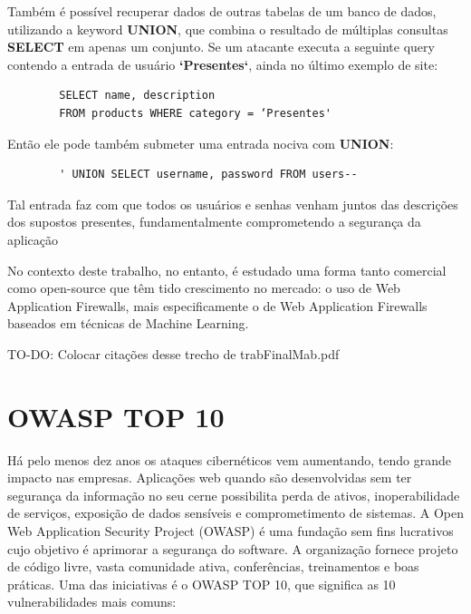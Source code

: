 \begin{alineas}
    \item
    Também é possível recuperar dados de outras tabelas de um banco de dados, utilizando a keyword \textbf{UNION}, que combina o resultado de múltiplas consultas \textbf{SELECT} em apenas um conjunto. Se um atacante executa a seguinte query contendo a entrada de usuário \textbf{`Presentes`}, ainda no último exemplo de site:
    
    \begin{verbatim}
        SELECT name, description
        FROM products WHERE category = ‘Presentes'
    \end{verbatim}
    
    Então ele pode também submeter uma entrada nociva com \textbf{UNION}:
    
    \begin{verbatim}
        ' UNION SELECT username, password FROM users--
    \end{verbatim}
        
    Tal entrada faz com que todos os usuários e senhas venham juntos das descrições dos supostos presentes, fundamentalmente comprometendo a segurança da aplicação

\end{alineas}


No contexto deste trabalho, no entanto, é estudado uma forma tanto comercial como open-source que têm tido crescimento no mercado: o uso de Web Application Firewalls, mais especificamente o de Web Application Firewalls baseados em técnicas de Machine Learning.

TO-DO: Colocar citações desse trecho de trabFinalMab.pdf 

\section{OWASP TOP 10}

Há pelo menos dez anos os ataques cibernéticos vem aumentando, tendo grande impacto nas empresas.
Aplicações web quando são desenvolvidas sem ter segurança da informação no seu cerne possibilita perda de ativos, inoperabilidade de serviços, exposição de dados sensíveis e comprometimento de sistemas. 
A Open Web Application Security Project (OWASP) é uma fundação sem fins lucrativos cujo objetivo é aprimorar a segurança do software. A organização fornece projeto de código livre, vasta comunidade ativa, conferências, treinamentos e boas práticas. Uma das iniciativas é o OWASP TOP 10, que significa as 10 vulnerabilidades mais comuns:

